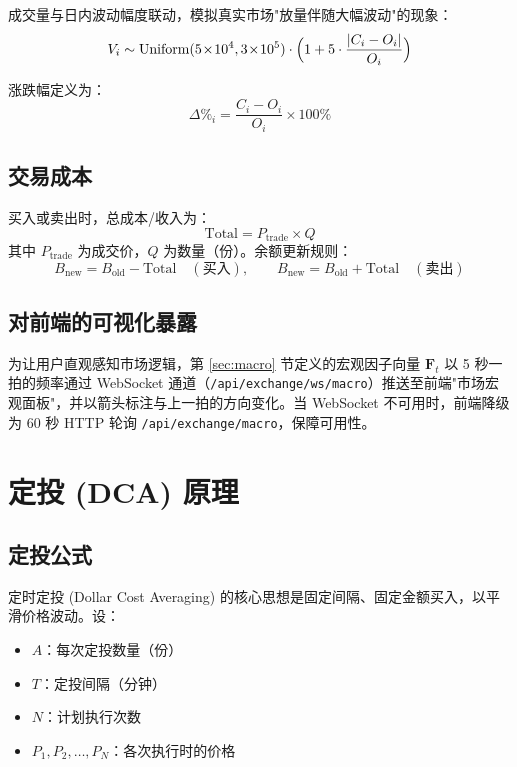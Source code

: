 \documentclass[12pt,a4paper]{article}
\begin{document}
成交量与日内波动幅度联动，模拟真实市场"放量伴随大幅波动"的现象：
\begin{equation}
V_i \sim \mathrm{Uniform}(5\!\times\!10^4, 3\!\times\!10^5) \cdot \Bigl(1 + 5 \cdot \frac{|C_i - O_i|}{O_i}\Bigr)
\end{equation}

涨跌幅定义为：
\begin{equation}
\Delta\%_i = \frac{C_i - O_i}{O_i} \times 100\%
\end{equation}

\subsection{交易成本}

买入或卖出时，总成本/收入为：
\begin{equation}
\mathrm{Total} = P_{\mathrm{trade}} \times Q
\end{equation}
其中 $P_{\mathrm{trade}}$ 为成交价，$Q$ 为数量（份）。余额更新规则：
\begin{equation}
B_{\mathrm{new}} = B_{\mathrm{old}} - \mathrm{Total} \quad (\text{买入}), \qquad B_{\mathrm{new}} = B_{\mathrm{old}} + \mathrm{Total} \quad (\text{卖出})
\end{equation}

\subsection{对前端的可视化暴露}

为让用户直观感知市场逻辑，第 \ref{sec:macro} 节定义的宏观因子向量 $\mathbf{F}_t$ 以 5 秒一拍的频率通过 WebSocket 通道（\texttt{/api/exchange/ws/macro}）推送至前端"市场宏观面板"，并以箭头标注与上一拍的方向变化。当 WebSocket 不可用时，前端降级为 60 秒 HTTP 轮询 \texttt{/api/exchange/macro}，保障可用性。

\section{定投 (DCA) 原理}

\subsection{定投公式}

定时定投 (Dollar Cost Averaging) 的核心思想是固定间隔、固定金额买入，以平滑价格波动。设：
\begin{itemize}
\item $A$：每次定投数量（份）
\item $T$：定投间隔（分钟）
\item $N$：计划执行次数
\item $P_1, P_2, \ldots, P_N$：各次执行时的价格
\end{itemize}
\end{document}
